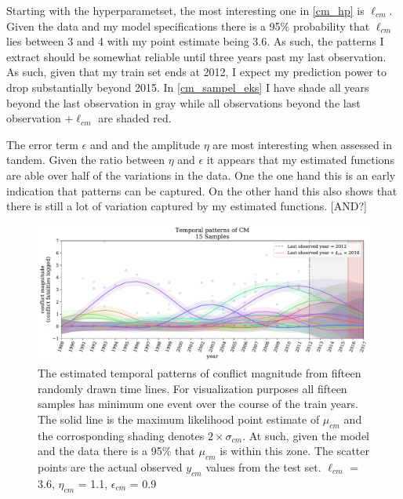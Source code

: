 \documentclass[a4paper]{article}
\begin{document}
Starting with the hyperparametset, the most interesting one in \autoref{cm_hp} is $\ell_{cm}$. Given the data and my model specifications there is a 95\% probability that $\ell_{cm}$ lies between 3 and 4 with my point estimate being 3.6. As such, the patterns I extract should be somewhat reliable until three years past my last observation. As such, given that my train set ends at 2012, I expect my prediction power to drop substantially beyond 2015. In \autoref{cm_sampel_eks} I have shade all years beyond the last observation in gray while all observations beyond the last observation $+\ell_{cm}$ are shaded red.\par

The error term $\epsilon$ and and the amplitude $\eta$ are most interesting when assessed in tandem. Given the ratio between $\eta$ and $\epsilon$ it appears that my estimated functions are able over half of the variations in the data. One the one hand this is an early indication that patterns can be captured. On the other hand this also shows that there is still a lot of variation captured by my estimated functions. [AND?]\par 

\begin{figure}[!htb]
	\centering
	\includegraphics[scale=0.47]{cm_15_samples.pdf}
    \caption{\footnotesize{The estimated temporal patterns of conflict magnitude from fifteen randomly drawn time lines. For visualization purposes all fifteen samples has minimum one event over the course of the train years. The solid line is the maximum likelihood point estimate of $\mu_{cm}$ and the corrosponding shading denotes $2\times\sigma_{cm}$. At such, given the model and the data there is a 95\% that $\mu_{cm}$ is within this zone. The scatter points are the actual observed $y_{cm}$ values from the test set. $\ell_{cm}$ = 3.6, $\eta_{cm}$ = 1.1, $\epsilon_{cm}$ = 0.9}\label{cm_sampel_eks}}
\end{figure}
\end{document}
